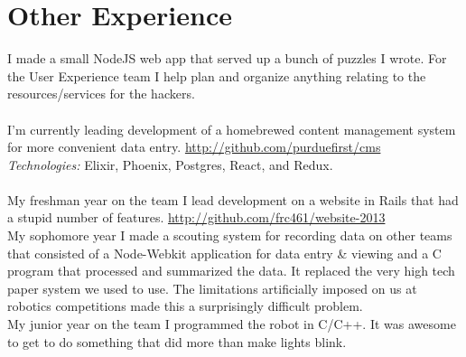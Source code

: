 \documentclass[11pt,letter,sans]{moderncv}
\begin{document}
\section{Other Experience}
I made a small NodeJS web app that served up a bunch of puzzles I wrote.
For the User Experience team I help plan and organize anything relating to the resources/services for the hackers.
\\
\\
I'm currently leading development of a homebrewed content management system for more convenient data entry. \url{http://github.com/purduefirst/cms}
\\
\textit{Technologies:} Elixir, Phoenix, Postgres, React, and Redux.
\\
\\
My freshman year on the team I lead development on a website in Rails that had a stupid number of features. \url{http://github.com/frc461/website-2013}
\\
My sophomore year I made a scouting system for recording data on other teams that consisted of a Node-Webkit application for data entry \& viewing and a C program that processed and summarized the data.
It replaced the very high tech paper system we used to use.
The limitations artificially imposed on us at robotics competitions made this a surprisingly difficult problem.
\\
My junior year on the team I programmed the robot in C/C++.
It was awesome to get to do something that did more than make lights blink.
\end{document}
